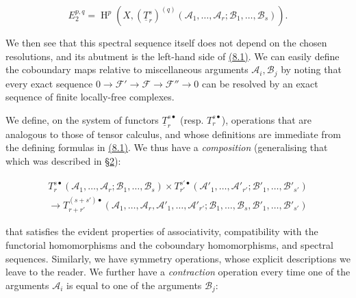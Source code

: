 \documentclass{article}
\newenvironment{eqenv}
  {}
  {}
\newcommand{\oldpage}[1]{\marginpar{\footnotesize$\Big\vert$ \textit{p.~#1}}}
\theoremstyle{definition}
\theoremstyle{definition}
\theoremstyle{definition}
\theoremstyle{definition}
\theoremstyle{remark}
\begin{document}
\leavevmode{}%
\begin{eqenv}
\[
  E_2^{p,q} = \operatorname{H}^p(X,(\underline{T}_r^s)^{(q)}({\mathscr{A}}_1,\ldots,{\mathscr{A}}_r;{\mathscr{B}}_1,\ldots,{\mathscr{B}}_s)).
\tag{8.2}
\]

\end{eqenv}

We then see that this spectral sequence itself does not depend on the chosen resolutions, and its abutment is the left-hand side of \protect\hyperlink{fga-1-equation-8.1}{(8.1)}.
We can easily define the coboundary maps relative to miscellaneous arguments \({\mathscr{A}}_i,{\mathscr{B}}_j\) by noting that every exact sequence \(0\to{\mathscr{F}}'\to{\mathscr{F}}\to{\mathscr{F}}''\to0\) can be resolved by an exact sequence of finite locally-free complexes.

We define, on the system of functors \(\underline{T}_r^{s\bullet}\) (resp. \(T_r^{s\bullet}\)), operations that are analogous to those of tensor calculus, and whose definitions are immediate from the defining formulas in \protect\hyperlink{fga-1-equation-8.1}{(8.1)}.
We thus have a \emph{composition} (generalising that which was described in \protect\hyperlink{fga-1-section-2}{§2}):

\leavevmode{}%
\begin{eqenv}
\[
  \begin{gathered}
    T_r^{s\bullet}({\mathscr{A}}_1,\ldots,{\mathscr{A}}_r;{\mathscr{B}}_1,\ldots,{\mathscr{B}}_s)
    \times T_{r'}^{s'\bullet}({\mathscr{A}}'_1,\ldots,{\mathscr{A}}'_{r'};{\mathscr{B}}'_1,\ldots,{\mathscr{B}}'_{s'})
  \\\to T_{r+r'}^{(s+s')\bullet}({\mathscr{A}}_1,\ldots,{\mathscr{A}}_r,{\mathscr{A}}'_1,\ldots,{\mathscr{A}}'_{r'};{\mathscr{B}}_1,\ldots,{\mathscr{B}}_s,{\mathscr{B}}'_1,\ldots,{\mathscr{B}}'_{s'})
  \end{gathered}
\tag{8.3}
\]

\end{eqenv}

that satisfies the evident properties of associativity, compatibility with the functorial homomorphisms and the coboundary homomorphisms, and spectral sequences.
Similarly, we have symmetry operations, whose explicit descriptions we leave to the reader.
\oldpage{149-23}We further have a \emph{contraction} operation every time one of the arguments \({\mathscr{A}}_i\) is equal to one of the arguments \({\mathscr{B}}_j\):
\end{document}
